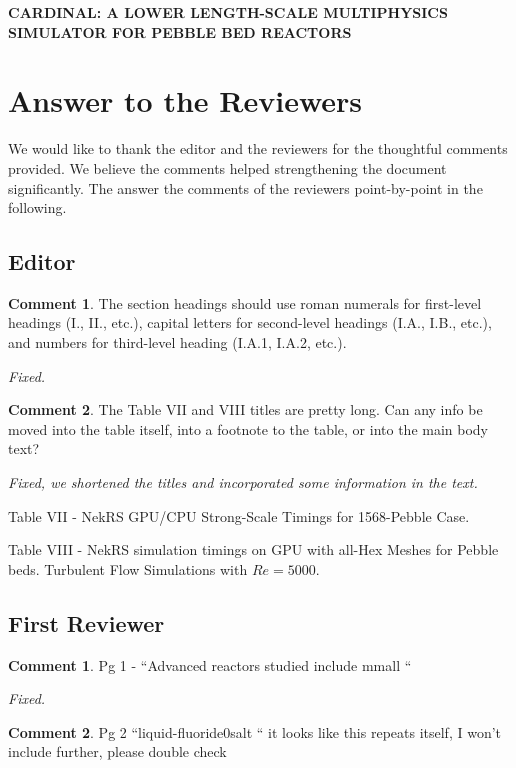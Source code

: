 \documentclass{nseJournal}
\begin{document}
\vspace*{-0.45in}
\begin{center}
{\Large\centering\bf CARDINAL: A LOWER LENGTH-SCALE MULTIPHYSICS SIMULATOR FOR PEBBLE BED REACTORS}
\end{center}
\vspace{3pt}

\normalsize

\section*{Answer to the Reviewers}

We would like to thank the editor and the reviewers for the thoughtful comments provided. We believe the comments helped strengthening the document significantly.  The answer the comments of the reviewers point-by-point in the following.

\subsection*{Editor}

\textbf{Comment 1}. The section headings should use roman numerals for first-level headings (I., II., etc.), capital letters for second-level headings (I.A., I.B., etc.), and numbers for third-level heading (I.A.1, I.A.2, etc.).

\textit{Fixed.}

\textbf{Comment 2}. The Table VII and VIII titles are pretty long. Can any info be moved into the table itself, into a footnote to the table, or into the main body text?

\textit{Fixed, we shortened the titles and incorporated some information in the text.}

Table VII - NekRS GPU/CPU Strong-Scale Timings for 1568-Pebble Case.

Table VIII - NekRS simulation timings on GPU with all-Hex Meshes for Pebble beds. Turbulent Flow Simulations with $Re = 5000$.

\subsection*{First Reviewer}

\textbf{Comment 1}. Pg 1  - “Advanced reactors studied include mmall “

\textit{Fixed.}

\textbf{Comment 2}. Pg 2 “liquid-fluoride0salt “ it looks like this repeats itself, I won’t include further, please double
check
\end{document}

